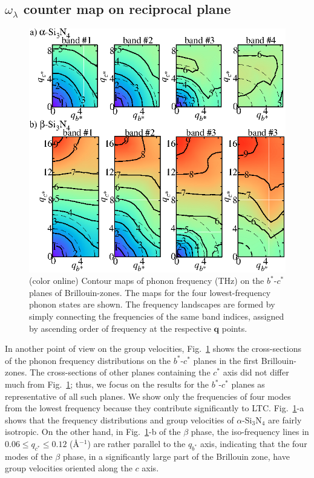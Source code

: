 \documentclass[twocolumn,amsmath,amssymb,a4paper,prb,superscriptaddress,floatfix]{revtex4-1}
\begin{document}
\subsection{$\omega_\lambda$ counter map on reciprocal plane}

\begin{figure}[ht]
 \centerins
  \includegraphics[width=\linewidth]{Fig2_small.eps} \caption{(color
  online) Contour maps of phonon frequency (THz) on the $b^*$-$c^*$
  planes of Brillouin-zones. The maps for the four lowest-frequency
  phonon states are shown. The frequency landscapes are formed by simply
  connecting the frequencies of the same band indices, assigned by
  ascending order of frequency at the respective $\mathbf {q}$
  points. \label{fig:Fig3_338} }
 \centering
\end{figure}

In another point of view on the group velocities, Fig.~\ref{fig:Fig3_338} shows
the cross-sections of the phonon frequency distributions on the $b^*$-$c^*$
planes in the first Brillouin-zones.  The cross-sections of other planes
containing the $c^*$ axis did not differ much from Fig.~\ref{fig:Fig3_338};
thus, we focus on the results for the $b^*$-$c^*$ planes as representative of
all such planes. We show only the frequencies of four modes from the lowest
frequency because they contribute significantly to LTC.
Fig.~\ref{fig:Fig3_338}-a shows that the frequency distributions and group
velocities of $\alpha$-Si$_3$N$_4$ are fairly isotropic.  On the other hand, in
Fig.~\ref{fig:Fig3_338}-b of the $\beta$ phase, the iso-frequency lines in
$0.06 \le q_{c^*} \le 0.12$ (\AA$^{-1}$) are rather parallel to the $q_{b^*}$
axis, indicating that the four modes of the $\beta$ phase, in a significantly
large part of the Brillouin zone, have group velocities oriented along the $c$
axis.
\end{document}
